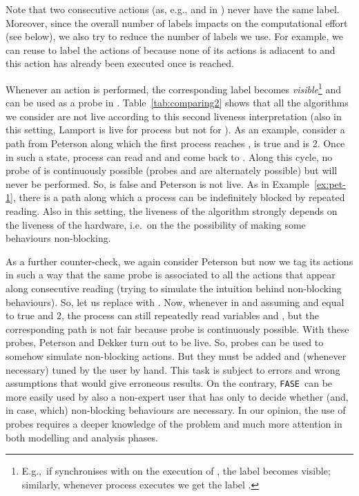 \documentclass[copyright,creativecommons]{eptcs}
\newcommand{\fase}{\texttt{FASE}}
\begin{document}
\hspace{2.5cm}


Note that two consecutive actions (as, e.g.,  and  in
) never have the same label. Moreover, since the overall number of
labels impacts on the computational effort (see below), we also try to
reduce the number of labels we use.  For example, we can reuse  to
label the actions of  because none of its actions is adiacent to
 and this action has already been executed once  is
reached. 

Whenever an action is performed, the corresponding label becomes {\it
visible}\footnote{E.g.,\ if  synchronises with  on the
execution of , the label  becomes visible; similarly,
whenever process  executes  we get the label .} and can
be used as a probe in . 
Table~\ref{tab:comparing2} shows that all the algorithms we consider are
not live according to this second liveness interpretation (also in this
setting, Lamport is live for process  but not for ). As
an example, consider a path from Peterson along
which the first process reaches ,  is true and  is 2. Once in such a state,
process  can read  and  and come back to . Along
this cycle, no probe of  is continuously possible (probes
 and  are alternately possible) but  will never be
performed. So,  is false and Peterson is not live. As in
Example~\ref{ex:pet-1}, there is a path along which a
process can be indefinitely blocked by repeated reading. Also in this
setting, the liveness of the algorithm strongly depends on the liveness of
the hardware, i.e.\ on the the possibility of making some behaviours
non-blocking.

As a further counter-check, we again consider Peterson but now we tag its
actions in such a way that the same probe is associated to all the  actions
that appear along consecutive reading (trying to simulate the intuition
behind non-blocking behaviours). So, let us replace  with 
. 
Now, whenever in  and assuming  and  equal to true and 2,
the process  can still repeatedly read variables  and
, but the corresponding path is not fair because probe  is
continuously possible. With these probes, Peterson and Dekker turn out to
be live.
So, probes can be used to somehow simulate non-blocking actions. But they
must be added and (whenever necessary) tuned by the user by hand. This
task is subject to errors and wrong assumptions that would give erroneous
results.  On the contrary, \fase\ can be more easily used by also a
non-expert user that has only to decide whether (and, in case,
which) non-blocking behaviours are necessary. In our opinion, the use of
probes requires a deeper knowledge of the problem and much
more attention in both modelling and analysis phases. 
\end{document}
